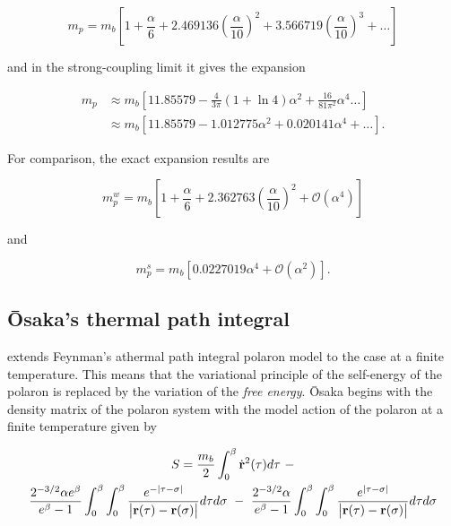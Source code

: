 \begin{equation}
    \label{eqn:weak_mass_feynman}
    m_p = m_b \left[ 1 + \frac{\alpha}{6} + 2.469136 \left(\frac{\alpha}{10}\right)^2 + 3.566719 \left(\frac{\alpha}{10}\right)^3 + \dots \right]
\end{equation}

and in the strong-coupling limit it gives the expansion

\begin{equation}
    \label{eqn:strong_mass_feynman}
    \begin{aligned}
    m_p &\approx m_b \left[ 11.85579 - \frac{4}{3\pi} (1 + \ln 4) \alpha^2 + \frac{16}{81\pi^2} \alpha^4 \dots \right] \\
    &\approx m_b \left[11.85579 - 1.012775 \alpha^2 + 0.020141 \alpha^4 + \dots\right].
    \end{aligned}
\end{equation}

For comparison, the exact expansion results are

\begin{equation}
    m^w_p = m_b \left[ 1 + \frac{\alpha}{6} + 2.362763 \left(\frac{\alpha}{10}\right)^2 + \mathcal{O}\left(\alpha^4\right) \right]
\end{equation}

and

\begin{equation}
    m^s_p = m_b \left[ 0.0227019 \alpha^4 + \mathcal{O}\left(\alpha^2\right) \right].
\end{equation}

\subsection{\=Osaka's thermal path integral}

\cite{osaka_polaron_1959} extends Feynman's athermal path integral polaron model to the case at a finite temperature. This means that the variational principle of the self-energy of the polaron is replaced by the variation of the \emph{free energy}. \=Osaka begins with the density matrix of the polaron system with the model action of the polaron at a finite temperature given by

\begin{equation}
    \begin{gathered}
    S = \frac{m_b}{2} \int_0^\beta \dot{\vb{r}}^2(\tau) d\tau\ -\\ \frac{2^{-3/2}\alpha e^\beta}{e^\beta - 1} \int_0^\beta \int_0^\beta \frac{e^{-|\tau-\sigma|}}{\left| \vb{r}(\tau) - \vb{r}(\sigma) \right|} d\tau d\sigma \ -\  \frac{2^{-3/2}\alpha}{e^\beta - 1} \int_0^\beta \int_0^\beta \frac{e^{|\tau-\sigma|}}{\left| \vb{r}(\tau) - \vb{r}(\sigma) \right|} d\tau d\sigma
    \end{gathered}
\end{equation}

